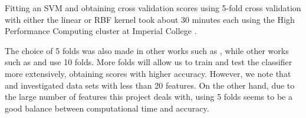 \documentclass[12pt, twoside, a4paper]{report}
\begin{document}
Fitting an SVM and obtaining cross validation scores using 5-fold cross validation with either the linear or RBF kernel took about 30 minutes each using the High Performance Computing cluster at Imperial College \cite{RefWorks:218}.

The choice of 5 folds was also made in other works such as \cite{RefWorks:187}, while other works such as \cite{RefWorks:202} and \cite{RefWorks:212} use 10 folds. More folds will allow us to train and test the classifier more extensively, obtaining scores with higher accuracy. However, we note that \cite{RefWorks:187} and \cite{RefWorks:202} investigated data sets with less than 20 features. On the other hand, due to the large number of features this project deals with, using 5 folds seems to be a good balance between computational time and accuracy.
\end{document}
